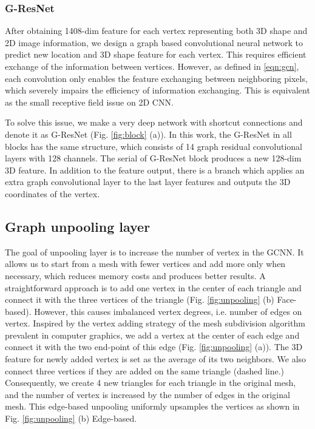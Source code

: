 \documentclass[runningheads]{llncs}
\newcommand{\figref}[1]{Fig. \ref{#1}}
\begin{document}
\subsubsection{G-ResNet}
After obtaining 1408-dim feature for each vertex representing both 3D shape and 2D image information, we design a graph based convolutional neural network to predict new location and 3D shape feature for each vertex.
This requires efficient exchange of the information between vertices.
However, as defined in \eqref{eqn:gcn}, each convolution only enables the feature exchanging between neighboring pixels, which severely impairs the efficiency of information exchanging. This is equivalent as the small receptive field issue on 2D CNN.

To solve this issue, we make a very deep network with shortcut connections \cite{HeZRS16} and denote it as G-ResNet (\figref{fig:block} (a)). In this work, the G-ResNet in all blocks has the same structure, which consists of 14 graph residual convolutional layers with 128 channels. The serial of G-ResNet block produces a new 128-dim 3D feature. In addition to the feature output, there is a branch which applies an extra graph convolutional layer to the last layer features and outputs the 3D coordinates of the vertex.






\subsection{Graph unpooling layer}
The goal of unpooling layer is to increase the number of vertex in the GCNN.
It allows us to start from a mesh with fewer vertices and add more only when necessary, which reduces memory costs and produces better results.
A straightforward approach is to add one vertex in the center of each triangle and connect it with the three vertices of the triangle (\figref{fig:unpooling} (b) Face-based). However, this causes imbalanced vertex degrees, i.e. number of edges on vertex.
Inspired by the vertex adding strategy of the mesh subdivision algorithm prevalent in computer graphics, we add a vertex at the center of each edge and connect it with the two end-point of this edge (\figref{fig:unpooling} (a)). 
The 3D feature for newly added vertex is set as the average of its two neighbors.
We also connect three vertices if they are added on the same triangle (dashed line.)
Consequently, we create 4 new triangles for each triangle in the original mesh, and the number of vertex is increased by the number of edges in the original mesh.
This edge-based unpooling uniformly upsamples the vertices as shown in \figref{fig:unpooling} (b) Edge-based.
\end{document}
